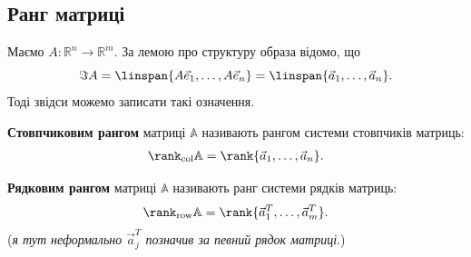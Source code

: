 \documentclass{math_library}
\begin{document}

\subsection{Ранг матриці}
Маємо $A \colon \mathbb{R}^n \to \mathbb{R}^m$. За лемою про структуру образа відомо, що
\[
\Im A = \linspan\{A\vec{e}_1,\dots, A\vec{e}_n\} = \linspan\{\vec{a}_1,\dots,\vec{a}_n\}.
\] 
Тоді звідси можемо записати такі означення.

\begin{definition}
\textbf{Стовпчиковим рангом} матриці $\mathbb{A}$ називають рангом системи стовпчиків матриць:
\begin{align*}
\rank_{\textrm{col}} \mathbb{A} = \rank \{\vec{a}_1,\dots,\vec{a}_n\}.
\end{align*}
\end{definition}

\begin{definition}
\textbf{Рядковим рангом} матриці $\mathbb{A}$ називають ранг системи рядків матриць:
\begin{align*}
\rank_{\textrm{row}} \mathbb{A} = \rank \{\vec{a}^T_1,\dots, \vec{a}^T_m \}.
\end{align*}
(\textit{я тут неформально $\vec{a}^T_j$ позначив за певний рядок матриці}.)
\end{definition}
\end{document}
